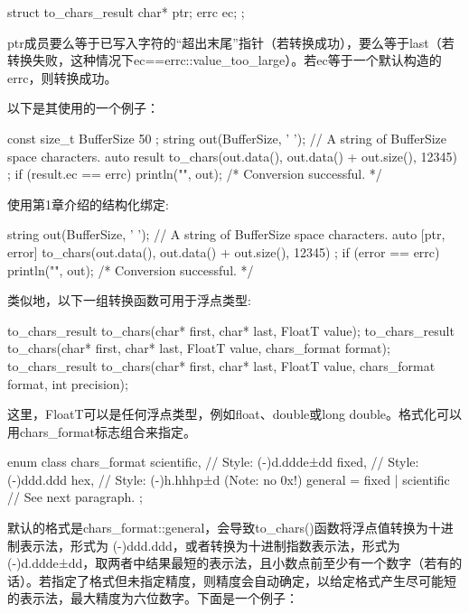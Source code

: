 \begin{cpp}
struct to_chars_result {
    char* ptr;
    errc ec;
};
\end{cpp}

ptr成员要么等于已写入字符的“超出末尾”指针（若转换成功），要么等于last（若转换失败，这种情况下ec==errc::value\_too\_large）。若ec等于一个默认构造的errc，则转换成功。

以下是其使用的一个例子：

\begin{cpp}
const size_t BufferSize { 50 };
string out(BufferSize, ' '); // A string of BufferSize space characters.
auto result { to_chars(out.data(), out.data() + out.size(), 12345) };
if (result.ec == errc{}) { println("{}", out); /* Conversion successful. */ }
\end{cpp}

使用第1章介绍的结构化绑定:

\begin{cpp}
string out(BufferSize, ' '); // A string of BufferSize space characters.
auto [ptr, error] { to_chars(out.data(), out.data() + out.size(), 12345) };
if (error == errc{}) { println("{}", out); /* Conversion successful. */ }
\end{cpp}

类似地，以下一组转换函数可用于浮点类型:

\begin{cpp}
to_chars_result to_chars(char* first, char* last, FloatT value);
to_chars_result to_chars(char* first, char* last, FloatT value,
                         chars_format format);
to_chars_result to_chars(char* first, char* last, FloatT value,
                         chars_format format, int precision);
\end{cpp}

这里，FloatT可以是任何浮点类型，例如float、double或long double。格式化可以用chars\_format标志组合来指定。

\begin{cpp}
enum class chars_format {
    scientific, // Style: (-)d.ddde±dd
    fixed, // Style: (-)ddd.ddd
    hex, // Style: (-)h.hhhp±d (Note: no 0x!)
    general = fixed | scientific // See next paragraph.
};
\end{cpp}

默认的格式是chars\_format::general，会导致to\_chars()函数将浮点值转换为十进制表示法，形式为 (-)ddd.ddd，或者转换为十进制指数表示法，形式为 (-)d.ddde±dd，取两者中结果最短的表示法，且小数点前至少有一个数字（若有的话）。若指定了格式但未指定精度，则精度会自动确定，以给定格式产生尽可能短的表示法，最大精度为六位数字。下面是一个例子：

